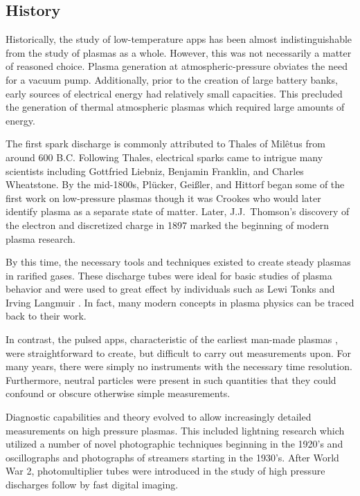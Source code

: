 \subsection{History}

Historically, the study of low-temperature \acs{app}s has been almost
indistinguishable from the study of plasmas as a whole. However, this was not
necessarily a matter of reasoned choice. Plasma generation at
atmospheric-pressure obviates the need for a vacuum pump. Additionally, prior to
the creation of large battery banks, early sources of electrical energy had
relatively small capacities. This precluded the generation of thermal
atmospheric plasmas which required large amounts of energy.

The first spark discharge is commonly attributed to Thales of Mil\^{e}tus from
around 600 B.C. Following Thales, electrical sparks came to intrigue many
scientists including Gottfried Liebniz, Benjamin Franklin, and Charles
Wheatstone. By the mid-1800s, Pl\"{u}cker, Gei\ss{}ler, and Hittorf began some
of the first work on low-pressure plasmas though it was Crookes who would later
identify plasma as a separate state of matter. Later, J.J.\ Thomson's discovery
of the electron and discretized charge in 1897 marked the beginning of modern
plasma research.

By this time, the necessary tools and techniques existed to create steady
plasmas in rarified gases. These discharge tubes were ideal for basic studies of
plasma behavior and were used to great effect by individuals such as Lewi Tonks
and Irving Langmuir \cite{Tonks1929}. In fact, many modern concepts in plasma
physics can be traced back to their work.

In contrast, the pulsed \acs{app}s, characteristic of the earliest man-made
plasmas \cite{Anders2003}, were straightforward to create, but difficult to
carry out measurements upon. For many years, there were simply no instruments
with the necessary time resolution. Furthermore, neutral particles were present
in such quantities that they could confound or obscure otherwise simple
measurements.

Diagnostic capabilities and theory evolved to allow increasingly detailed
measurements on high pressure plasmas. This included lightning research which
utilized a number of novel photographic techniques beginning in the 1920's and
oscillographs and photographs of streamers starting in the 1930's. After World
War 2, photomultiplier tubes were introduced in the study of high pressure
discharges follow by fast digital imaging. 


